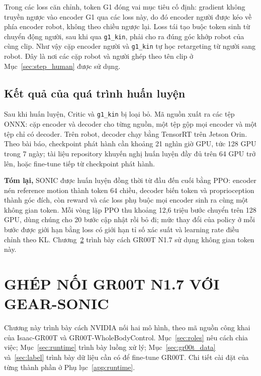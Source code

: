 \documentclass[12pt,a4paper,oneside]{report}
\newcommand{\code}[1]{\texttt{#1}}
\begin{document}
Trong các loss căn chỉnh, token G1 đóng vai mục tiêu cố định: gradient không truyền ngược vào encoder G1 qua các loss này, do đó encoder người được kéo về phía encoder robot, không theo chiều ngược lại. Loss tái tạo buộc token sinh từ chuyển động người, sau khi qua \code{g1\_kin}, phải cho ra đúng góc khớp robot của cùng clip. Như vậy cặp encoder người và \code{g1\_kin} tự học retargeting từ người sang robot. Đây là nơi các cặp robot và người ghép theo tên clip ở Mục~\ref{sec:step_human} được sử dụng.

\section{Kết quả của quá trình huấn luyện}

Sau khi huấn luyện, Critic và \code{g1\_kin} bị loại bỏ. Mã nguồn xuất ra các tệp ONNX: cặp encoder và decoder cho từng nguồn, một tệp gộp mọi encoder và một tệp chỉ có decoder. Trên robot, decoder chạy bằng TensorRT trên Jetson Orin. Theo bài báo, checkpoint phát hành cần khoảng 21 nghìn giờ GPU, tức 128 GPU trong 7 ngày; tài liệu repository khuyến nghị huấn luyện đầy đủ trên 64 GPU trở lên, hoặc fine-tune tiếp từ checkpoint phát hành.

\textbf{Tóm lại,} SONIC được huấn luyện đồng thời từ đầu đến cuối bằng PPO: encoder nén reference motion thành token 64 chiều, decoder biến token và proprioception thành góc đích, còn reward và các loss phụ buộc mọi encoder sinh ra cùng một không gian token. Mỗi vòng lặp PPO thu khoảng 12,6 triệu bước chuyển trên 128 GPU, dùng chúng cho 20 bước cập nhật rồi bỏ đi; mức thay đổi của policy ở mỗi bước được giới hạn bằng loss có giới hạn tỉ số xác suất và learning rate điều chỉnh theo KL. Chương~\ref{chap:combine} trình bày cách GR00T N1.7 sử dụng không gian token này.

\chapter{GHÉP NỐI GR00T N1.7 VỚI GEAR-SONIC}
\label{chap:combine}
Chương này trình bày cách NVIDIA nối hai mô hình, theo mã nguồn công khai của Isaac-GR00T và GR00T-WholeBodyControl. Mục~\ref{sec:roles} nêu cách chia việc; Mục~\ref{sec:runtime} trình bày luồng xử lý; Mục~\ref{sec:gr00t_data} và~\ref{sec:label} trình bày dữ liệu cần có để fine-tune GR00T. Chi tiết cài đặt của từng thành phần ở Phụ lục~\ref{app:runtime}.
\end{document}
